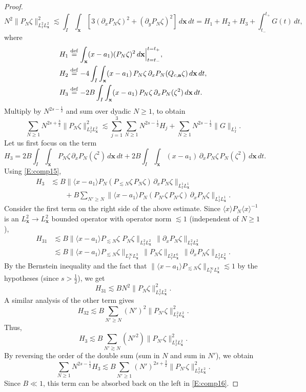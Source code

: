 \documentclass[12pt,letterpaper]{amsart}
\newcommand{\la}{\langle}
\newcommand{\ra}{\rangle}
\newcommand{\defeq}{\stackrel{\rm{def}}{=}}
\theoremstyle{remark}
\numberwithin{equation}{section}
\numberwithin{theorem}{section}
\numberwithin{table}{section}
\begin{document}
\begin{proof}
$$N^2 \| P_N \zeta \|_{L_I^2 L_{\mathbf{x}}^2}^2 \lesssim \int_I\int_{\mathbf{x}} [3 (\partial_x P_N \zeta)^2 + (\partial_y P_N\zeta)^2]  \, d\mathbf{x} \, dt = H_1+H_2+H_3 + \int_{t_-}^{t_+}G(t) \,dt,
$$
where
\begin{align*}
H_1 &\defeq \int_{\mathbf{x}} (x-a_1) (P_N \zeta)^2 \, d\mathbf{x}  \Big|^{t=t_+}_{t=t_-},  \\
H_2 &\defeq - 4 \int_I \int_{\mathbf{x}} (x-a_1) \, P_N \zeta \, \partial_x P_N ( Q_{c,\mathbf{a}} \zeta) \, d\mathbf{x} \, dt, \\
H_3 &\defeq - 2 B \int_I \int_{\mathbf{x}} (x-a_1) \, P_N \zeta \, \partial_x P_N ( \zeta^2) \, d \mathbf{x} \, dt.
\end{align*}
Multiply by $N^{2s-\frac12}$ and sum over dyadic $N\geq 1$, to obtain
\begin{equation}
\label{E:comp16}
\sum_{N\geq 1} N^{2s+\frac32} \|P_N \zeta\|_{L_I^2 L_{\mathbf{x}}^2}^2 \lesssim \sum_{j=1}^3 \sum_{N\geq 1} N^{2s-\frac12} H_j + \sum_{N\geq 1} N^{2s-\frac12} \|G\|_{L_I^1}.
\end{equation}
Let us first focus on the term 
$$
H_3 =  2 B \int_I \int_{\mathbf{x}}  \, P_N \zeta \, \partial_x P_N ( \zeta^2) \, d \mathbf{x} \, dt + 2 B \int_I \int_{\mathbf{x}} (x-a_1) \, \partial_x P_N \zeta \,  P_N ( \zeta^2) \, d \mathbf{x} \, dt.
$$
Using \eqref{E:comp15},
\begin{align*}
H_3 &\lesssim B \| \la x-a_1\ra P_N ( P_{\lesssim N} \zeta \, P_N \zeta) \, \partial_x P_N \zeta \|_{L_I^1 L_{\mathbf{x}}^1} \\
& \qquad + B \sum_{N'\geq N}\| \la x-a_1\ra P_N ( P_{N'} \zeta \, P_{N'} \zeta) \, \partial_x P_N \zeta \|_{L_I^1 L_{\mathbf{x}}^1}.
\end{align*}
Consider the first term on the right side of the above estimate.  Since $\la x \ra P_N \la x \ra^{-1}$ is an $L^2_{\mathbf{x}} \to L^2_{\mathbf{x}}$ bounded operator with operator norm $\lesssim 1$ (independent of $N\geq 1$),
\begin{align*}
H_{31} &\lesssim B\| \la x-a_1 \ra P_{\lesssim N} \zeta \, \, P_N \zeta \|_{L_I^2 L_{\mathbf{x}}^2} \, \| \partial_x P_N \zeta\|_{L_I^2 L_{\mathbf{x}}^2}\\
&\lesssim B \| \la x-a_1\ra P_{\lesssim N} \zeta \|_{L_I^\infty L_{\mathbf{x}}^3} \, \|P_N \zeta \|_{L_I^2 L_{\mathbf{x}}^6} \, \| \partial_x P_N \zeta \|_{L_I^2 L_\mathbf{x}^2}.
\end{align*}
By the Bernstein inequality and the fact that $\| \la x-a_1\ra P_{\lesssim N} \zeta \|_{L_I^\infty L_{\mathbf{x}}^3} \lesssim 1$ by the hypotheses (since $s>\frac12$), we get
$$
H_{31} \lesssim B N^2 \|P_N \zeta \|_{L_I^2 L_\mathbf{x}^2}^2.
$$
A similar analysis of the other term gives
$$
H_{32} \lesssim B \sum_{N'\geq N} (N')^2 \|P_{N'} \zeta \|_{L_I^2 L_\mathbf{x}^2}^2.
$$
Thus,
$$ 
H_3 \lesssim  B \sum_{N' \gtrsim N} (N'^2)  \| P_{N'} \zeta \|_{L_I^2 L_{\mathbf{x}}^2}^2. 
$$
By reversing the order of the double sum (sum in $N$ and sum in $N'$), we obtain
$$
\sum_{N \geq 1} N^{2s-\frac12} H_3 \lesssim B\sum_{N' \geq 1} (N')^{2s+\frac32} \|P_{N'}\zeta\|_{L_I^2L_{\mathbf{x}}^2}^2.
$$
Since $B\ll 1$, this term can be absorbed back on the left in \eqref{E:comp16}.   


\end{proof}
\end{document}
